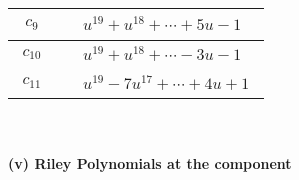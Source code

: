 \documentclass[1p]{elsarticle_modified}
\theoremstyle{definition}
\begin{document}
\begin{tabular}{m{50pt}|m{274pt}}
\hline $$\begin{aligned}c_{9}\end{aligned}$$&$\begin{aligned}
&u^{19}+u^{18}+\cdots+5 u-1
\end{aligned}$\\
\hline $$\begin{aligned}c_{10}\end{aligned}$$&$\begin{aligned}
&u^{19}+u^{18}+\cdots-3 u-1
\end{aligned}$\\
\hline $$\begin{aligned}c_{11}\end{aligned}$$&$\begin{aligned}
&u^{19}-7 u^{17}+\cdots+4 u+1
\end{aligned}$\\
\hline
\end{tabular}\\~\\
\newpage\renewcommand{\arraystretch}{1}
\flushleft \textbf{(v) Riley Polynomials at the component}\newline \\
\end{document}
